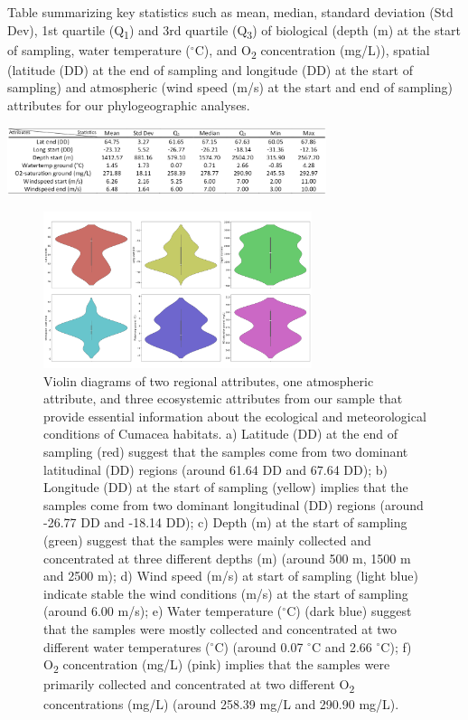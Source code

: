 {\begin{table}[H]
    \centering
    \caption{Table summarizing key statistics such as mean, median, standard deviation (Std Dev), 1st quartile (Q\textsubscript{1}) and 3rd quartile (Q\textsubscript{3}) of biological (depth (m) at the start of sampling, water temperature ($^\circ$C), and O\textsubscript{2} concentration (mg/L)), spatial (latitude (DD) at the end of sampling and longitude (DD) at the start of sampling) and atmospheric (wind speed (m/s) at the start and end of sampling) attributes for our phylogeographic analyses. \label{fig:tab1}}
    \includegraphics[width=0.7\textwidth]{Table_Attributes_Data.png}
\end{table}

\begin{figure}[htbp]
    \centering
    \includegraphics[width=0.7\textwidth]{figure1.jpg}
    \caption{Violin diagrams of two regional attributes, one atmospheric attribute, and three ecosystemic attributes from our sample that provide essential information about the ecological and meteorological conditions of Cumacea habitats. a) Latitude (DD) at the end of sampling (red) suggest that the samples come from two dominant latitudinal (DD) regions (around 61.64 DD and 67.64 DD); b) Longitude (DD) at the start of sampling (yellow) implies that the samples come from two dominant longitudinal (DD) regions (around -26.77 DD and -18.14 DD); c) Depth (m) at the start of sampling (green) suggest that the samples were mainly collected and concentrated at three different depths (m) (around 500 m, 1500 m and 2500 m); d) Wind speed (m/s) at start of sampling (light blue) indicate stable the wind conditions (m/s) at the start of sampling (around 6.00 m/s); e) Water temperature ($^\circ$C) (dark blue) suggest that the samples were mostly collected and concentrated at two different water temperatures ($^\circ$C) (around 0.07 $^\circ$C and 2.66 $^\circ$C); f) O\textsubscript{2} concentration (mg/L) (pink) implies that the samples were primarily collected and concentrated at two different O\textsubscript{2} concentrations (mg/L) (around 258.39 mg/L and 290.90 mg/L). \label{fig:fig2}}
\end{figure}

}
